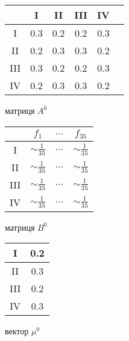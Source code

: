 \vspace{0.4cm}
\begin{table}[H]
    \begin{minipage}[H]{0.4\linewidth}
        \begin{center}
            \begin{tabular}{c|ccccc}
                & I & II & III & IV \\
                \hline
                I & 0.3 & 0.2 & 0.2 & 0.3 \\
                II & 0.2 & 0.3 & 0.3 & 0.2 \\
                III & 0.3 & 0.2 & 0.2 & 0.3 \\
                IV & 0.2 & 0.3 & 0.3 & 0.2 \\
            \end{tabular}
        \end{center} \centering матриця $A^0$
    \end{minipage}
    \hfill
    \begin{minipage}[H]{0.38\linewidth}
        \begin{center}
            \begin{tabular}{c|ccc}
                & $f_1$ & $\ldots$ & $f_{35}$ \\
                \hline
                I & $\sim \frac{1}{35}$ & $\ldots$ & $\sim \frac{1}{35}$ \\
                II & $\sim \frac{1}{35}$ & $\ldots$ & $\sim \frac{1}{35}$ \\
                III & $\sim \frac{1}{35}$ & $\ldots$ & $\sim \frac{1}{35}$ \\
                IV & $\sim \frac{1}{35}$ & $\ldots$ & $\sim \frac{1}{35}$ \\
            \end{tabular}
        \end{center} \centering матриця $B^0$
    \end{minipage}
    \hfill
    \begin{minipage}[H]{0.16\linewidth}
        \begin{center}
            \begin{tabular}{c|c}
                I & 0.2 \\
                \hline
                II & 0.3 \\
                \hline
                III & 0.2 \\
                \hline
                IV & 0.3 \\
            \end{tabular}
        \end{center} \centering вектор $\mu^0$
    \end{minipage}
\end{table}

